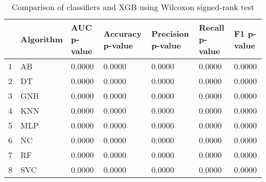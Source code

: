 \begin{table}
\footnotesize
\caption{Comparison of classifiers and XGB using Wilcoxon signed-rank test}
\label{tab:wilcoxon comparison}
\begin{tabular}{lllllll}
\hline
 & Algorithm & AUC p-value & Accuracy p-value & Precision p-value & Recall p-value & F1 p-value \\
\hline
1 & AB & 0.0000 & 0.0000 & 0.0000 & 0.0000 & 0.0000 \\
2 & DT & 0.0000 & 0.0000 & 0.0000 & 0.0000 & 0.0000 \\
3 & GNB & 0.0000 & 0.0000 & 0.0000 & 0.0000 & 0.0000 \\
4 & KNN & 0.0000 & 0.0000 & 0.0000 & 0.0000 & 0.0000 \\
5 & MLP & 0.0000 & 0.0000 & 0.0000 & 0.0000 & 0.0000 \\
6 & NC & 0.0000 & 0.0000 & 0.0000 & 0.0000 & 0.0000 \\
7 & RF & 0.0000 & 0.0000 & 0.0000 & 0.0000 & 0.0000 \\
8 & SVC & 0.0000 & 0.0000 & 0.0000 & 0.0000 & 0.0000 \\
\hline
\end{tabular}
\end{table}
